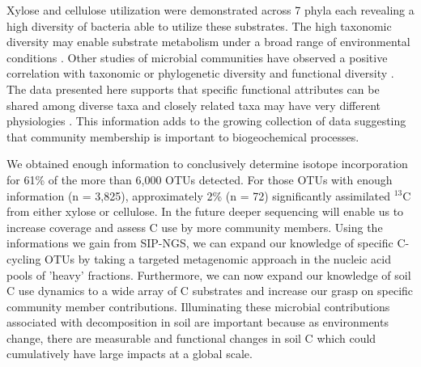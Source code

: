 Xylose and cellulose utilization were demonstrated across 7 phyla each
revealing a high diversity of bacteria able to utilize these substrates. The
high taxonomic diversity may enable substrate metabolism under a broad range of
environmental conditions \citep{Goldfarb_2011}. Other studies of microbial
communities have observed a positive correlation with taxonomic or phylogenetic
diversity and functional diversity
\citep{Fierer_2012,Fierer_2013,Philippot_2010,Tringe_2005,Gilbert_2010,Bryant_2012}.
The data presented here supports that specific functional attributes can be
shared among diverse taxa and closely related taxa may have very different
physiologies \citep{Fierer_2012,Philippot_2010}. This information adds to the
growing collection of data suggesting that community membership is important to
biogeochemical processes.

We obtained enough information to conclusively
determine isotope incorporation for 61\% of the more than 6,000 OTUs detected.
For those OTUs with enough information (n = 3,825), approximately 2\% (n = 72)
significantly assimilated $^{13}$C from either xylose or cellulose. In the
future deeper sequencing will enable us to increase coverage and assess C use
by more community members. Using the informations we gain from SIP-NGS, we can
expand our knowledge of specific C-cycling OTUs by taking a targeted
metagenomic approach in the nucleic acid pools of 'heavy' fractions.
Furthermore, we can now expand our knowledge of soil C use dynamics to a wide
array of C substrates and increase our grasp on specific community member
contributions. Illuminating these microbial contributions associated with
decomposition in soil are important because as environments change, there are
measurable and functional changes in soil C \citep{Grandy_2008} which could
cumulatively have large impacts at a global scale.
